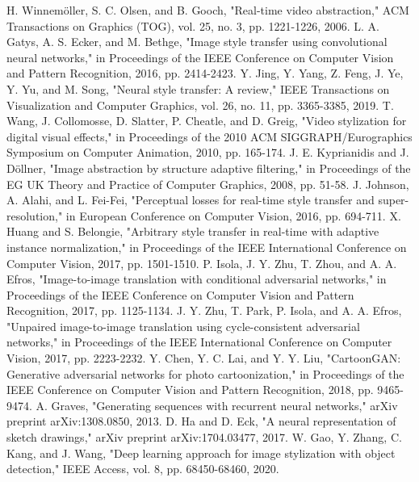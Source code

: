 \documentclass[conference]{IEEEtran}
\begin{document}
\begin{thebibliography}{00}
 H. Winnemöller, S. C. Olsen, and B. Gooch, "Real-time video abstraction," ACM Transactions on Graphics (TOG), vol. 25, no. 3, pp. 1221-1226, 2006.
 L. A. Gatys, A. S. Ecker, and M. Bethge, "Image style transfer using convolutional neural networks," in Proceedings of the IEEE Conference on Computer Vision and Pattern Recognition, 2016, pp. 2414-2423.
 Y. Jing, Y. Yang, Z. Feng, J. Ye, Y. Yu, and M. Song, "Neural style transfer: A review," IEEE Transactions on Visualization and Computer Graphics, vol. 26, no. 11, pp. 3365-3385, 2019.
 T. Wang, J. Collomosse, D. Slatter, P. Cheatle, and D. Greig, "Video stylization for digital visual effects," in Proceedings of the 2010 ACM SIGGRAPH/Eurographics Symposium on Computer Animation, 2010, pp. 165-174.
 J. E. Kyprianidis and J. Döllner, "Image abstraction by structure adaptive filtering," in Proceedings of the EG UK Theory and Practice of Computer Graphics, 2008, pp. 51-58.
 J. Johnson, A. Alahi, and L. Fei-Fei, "Perceptual losses for real-time style transfer and super-resolution," in European Conference on Computer Vision, 2016, pp. 694-711.
 X. Huang and S. Belongie, "Arbitrary style transfer in real-time with adaptive instance normalization," in Proceedings of the IEEE International Conference on Computer Vision, 2017, pp. 1501-1510.
 P. Isola, J. Y. Zhu, T. Zhou, and A. A. Efros, "Image-to-image translation with conditional adversarial networks," in Proceedings of the IEEE Conference on Computer Vision and Pattern Recognition, 2017, pp. 1125-1134.
 J. Y. Zhu, T. Park, P. Isola, and A. A. Efros, "Unpaired image-to-image translation using cycle-consistent adversarial networks," in Proceedings of the IEEE International Conference on Computer Vision, 2017, pp. 2223-2232.
 Y. Chen, Y. C. Lai, and Y. Y. Liu, "CartoonGAN: Generative adversarial networks for photo cartoonization," in Proceedings of the IEEE Conference on Computer Vision and Pattern Recognition, 2018, pp. 9465-9474.
 A. Graves, "Generating sequences with recurrent neural networks," arXiv preprint arXiv:1308.0850, 2013.
 D. Ha and D. Eck, "A neural representation of sketch drawings," arXiv preprint arXiv:1704.03477, 2017.
 W. Gao, Y. Zhang, C. Kang, and J. Wang, "Deep learning approach for image stylization with object detection," IEEE Access, vol. 8, pp. 68450-68460, 2020.

\end{thebibliography}
\end{document}
